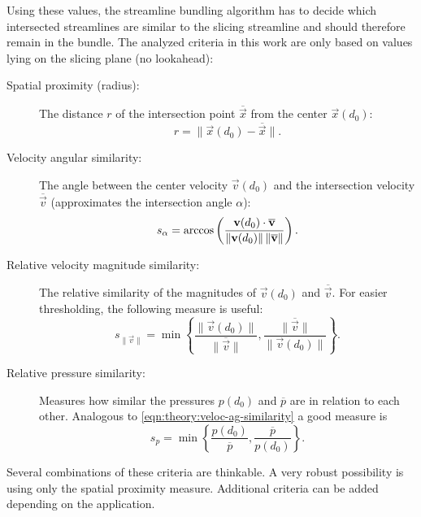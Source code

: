 Using these values, the streamline bundling algorithm has to decide which intersected streamlines are similar to the slicing streamline and should therefore remain in the bundle. The analyzed criteria in this work are only based on values lying on the slicing plane (no lookahead):
%
\begin{description}
%
  \item[Spatial proximity (radius):] The distance $r$ of the intersection point $\overline{\vec{x}}$ from the center $\vec{x}(d_0)$:
    \begin{equation}
    \label{eqn:theory:slicesimil:radius}
    	r = \| \vec{x}(d_0) - \overline{\vec{x}} \|.
    \end{equation}
%
  \item[Velocity angular similarity:] The angle between the center velocity $\vec{v}(d_0)$ and the intersection velocity $\overline{\vec{v}}$ (approximates the intersection angle $\alpha$):
  	\begin{equation}
  	  s_\alpha = \arccos\left( \frac{ {\mathbf v}(d_0) \cdot \overline{{\mathbf v}}}
  	                              { \|{\mathbf v}(d_0)\| \, \|\overline{{\mathbf v}}\|}
  	                    \right).
  	\end{equation}
%
  \item[Relative velocity magnitude similarity:] The relative similarity of the magnitudes of $\vec{v}(d_0)$ and $\overline{\vec{v}}$. For easier thresholding, the following measure is useful:
		\begin{equation} \label{eqn:theory:veloc-ag-similarity}
			s_{\|\vec{v}\|} = \min\left\{
			  \frac{\| \vec{v}(d_0) \|}{\| \overline{\vec{v}} \|},
			  \frac{\| \overline{\vec{v}} \|}{\| \vec{v}(d_0)\|} \right\}.
		\end{equation}
%
  \item[Relative pressure similarity:] Measures how similar the pressures $p(d_0)$ and $\overline{p}$ are in relation to each other. Analogous to \autoref{eqn:theory:veloc-ag-similarity} a good measure is 
    \begin{equation}
    	s_p = \min\left\{ \frac{p(d_0)}{\overline{p}},
    	                 \frac{\overline{p}}{p(d_0)} \right\}.
    \end{equation}
%
\end{description}

Several combinations of these criteria are thinkable. A very robust possibility is using only the spatial proximity measure. Additional criteria can be added depending on the application.%

